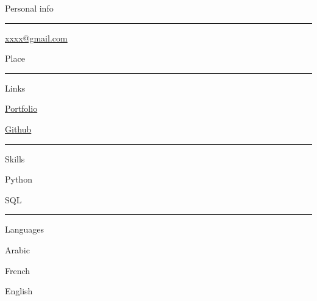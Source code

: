 \documentclass{letter}
\begin{document}
\begin{minipage}[t]{0.40\textwidth}
\setlength{\baselineskip}{1.5\baselineskip}
\color{white}
\vspace{1cm}
{\large Personal info}

\rule{\linewidth}{0.4pt}

\faPhone \quad 


\faEnvelope \quad \href{somelink.com}{xxxx@gmail.com}


\faMapMarker \quad Place

\rule{\linewidth}{0.4pt}

{\large Links}

\faCode \quad \href{google.com}{Portfolio}

\faGithub \quad \href{github.com}{Github}

\rule{\linewidth}{0.4pt}

{\large Skills}

\faCircleNotch \quad Python

\faCircleNotch \quad SQL


\rule{\linewidth}{0.4pt}

{\large Languages}

\faLanguage \quad Arabic

\faLanguage \quad French

\faLanguage \quad English

\end{minipage}
\hfill
\end{document}
